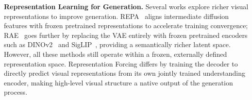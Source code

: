 \textbf{Representation Learning for Generation.}
Several works explore richer visual representations to improve generation. REPA~\cite{repa} aligns intermediate diffusion features with frozen pretrained representations to accelerate training convergence; RAE~\cite{rae,scale-rae-2026} goes further by replacing the VAE entirely with frozen pretrained encoders such as DINOv2~\cite{dinov2} and SigLIP~\cite{siglip}, providing a semantically richer latent space. However, all these methods still operate within a frozen, externally defined representation space. Representation Forcing differs by training the decoder to directly predict visual representations from its own jointly trained understanding encoder, making high-level visual structure a native output of the generation process.
